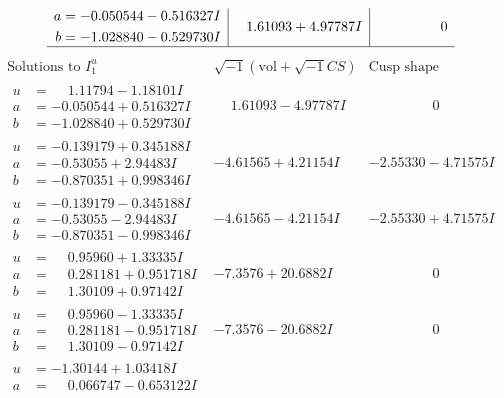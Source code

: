 \documentclass[1p]{elsarticle_modified}
\theoremstyle{definition}
\newcommand{\I}{\sqrt{-1}}
\begin{document}
$$\begin{array}{c|c|c}
\begin{aligned}
a &= -0.050544 - 0.516327 I \\
b &= -1.028840 - 0.529730 I\end{aligned}
 & \phantom{-}1.61093 + 4.97787 I & \phantom{-0.000000 } 0\\
 \hline 
 \end{array}$$\newpage$$\begin{array}{c|c|c}  
\text{Solutions to }I^u_{1}& \I (\text{vol} + \sqrt{-1}CS) & \text{Cusp shape}\\
 \hline 
\begin{aligned}
u &= \phantom{-}1.11794 - 1.18101 I \\
a &= -0.050544 + 0.516327 I \\
b &= -1.028840 + 0.529730 I\end{aligned}
 & \phantom{-}1.61093 - 4.97787 I & \phantom{-0.000000 } 0 \\ \hline\begin{aligned}
u &= -0.139179 + 0.345188 I \\
a &= -0.53055 + 2.94483 I \\
b &= -0.870351 + 0.998346 I\end{aligned}
 & -4.61565 + 4.21154 I & -2.55330 - 4.71575 I \\ \hline\begin{aligned}
u &= -0.139179 - 0.345188 I \\
a &= -0.53055 - 2.94483 I \\
b &= -0.870351 - 0.998346 I\end{aligned}
 & -4.61565 - 4.21154 I & -2.55330 + 4.71575 I \\ \hline\begin{aligned}
u &= \phantom{-}0.95960 + 1.33335 I \\
a &= \phantom{-}0.281181 + 0.951718 I \\
b &= \phantom{-}1.30109 + 0.97142 I\end{aligned}
 & -7.3576 + 20.6882 I & \phantom{-0.000000 } 0 \\ \hline\begin{aligned}
u &= \phantom{-}0.95960 - 1.33335 I \\
a &= \phantom{-}0.281181 - 0.951718 I \\
b &= \phantom{-}1.30109 - 0.97142 I\end{aligned}
 & -7.3576 - 20.6882 I & \phantom{-0.000000 } 0 \\ \hline\begin{aligned}
u &= -1.30144 + 1.03418 I \\
a &= \phantom{-}0.066747 - 0.653122 I \\

\end{aligned}
\end{array}$$
\end{document}
